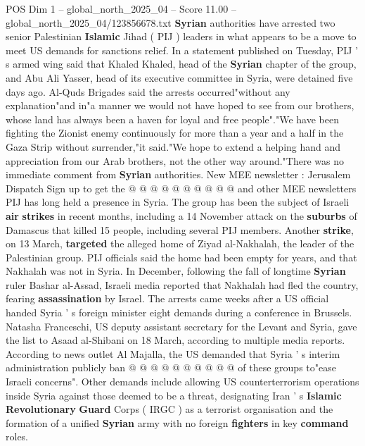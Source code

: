 \begin{textsample}{POS Dim 1 – global\_north\_2025\_04 – Score 11.00 – global\_north\_2025\_04/123856678.txt}  \label{ex:f1_pos_420}
\textbf{Syrian} authorities have arrested two senior Palestinian \textbf{Islamic} Jihad ( PIJ ) leaders in what appears to be a move to meet US demands for sanctions relief.
In a statement published on Tuesday, PIJ ' s armed wing said that Khaled Khaled, head of the \textbf{Syrian} chapter of the group, and Abu Ali Yasser, head of its executive committee in Syria, were detained five days ago.
Al-Quds Brigades said the arrests occurred"without any explanation"and in"a manner we would not have hoped to see from our brothers, whose land has always been a haven for loyal and free people"."We have been fighting the Zionist enemy continuously for more than a year and a half in the Gaza Strip without surrender,"it said."We hope to extend a helping hand and appreciation from our Arab brothers, not the other way around."There was no immediate comment from \textbf{Syrian} authorities.
New MEE newsletter : Jerusalem Dispatch Sign up to get the @ @ @ @ @ @ @ @ @ @ and other MEE newsletters PIJ has long held a presence in Syria.
The group has been the subject of Israeli \textbf{air} \textbf{strikes} in recent months, including a 14 November attack on the \textbf{suburbs} of Damascus that killed 15 people, including several PIJ members.
Another \textbf{strike}, on 13 March, \textbf{targeted} the alleged home of Ziyad al-Nakhalah, the leader of the Palestinian group.
PIJ officials said the home had been empty for years, and that Nakhalah was not in Syria.
In December, following the fall of longtime \textbf{Syrian} ruler Bashar al-Assad, Israeli media reported that Nakhalah had fled the country, fearing \textbf{assassination} by Israel.
The arrests came weeks after a US official handed Syria ' s foreign minister eight demands during a conference in Brussels.
Natasha Franceschi, US deputy assistant secretary for the Levant and Syria, gave the list to Asaad al-Shibani on 18 March, according to multiple media reports.
According to news outlet Al Majalla, the US demanded that Syria ' s interim administration publicly ban @ @ @ @ @ @ @ @ @ @ of these groups to"ease Israeli concerns".
Other demands include allowing US counterterrorism operations inside Syria against those deemed to be a threat, designating Iran ' s \textbf{Islamic} \textbf{Revolutionary} \textbf{Guard} Corps ( IRGC ) as a terrorist organisation and the formation of a unified \textbf{Syrian} army with no foreign \textbf{fighters} in key \textbf{command} roles.

\end{textsample}
